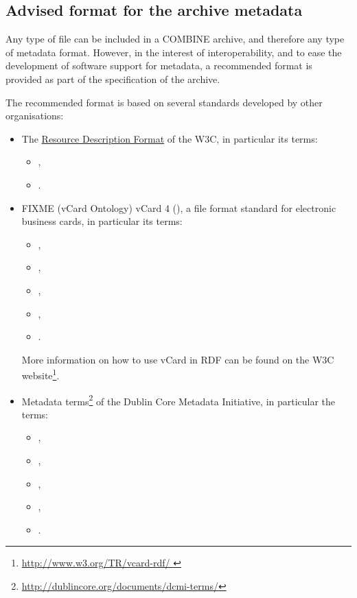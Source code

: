 \subsection{Advised format for the archive metadata}

Any type of file can be included in a COMBINE archive, and therefore any 
type of metadata format. However, in the interest of interoperability, 
and to ease the development of software support for metadata, a 
recommended format is provided as part of the specification of the 
archive. 

The recommended format is based on several standards developed by other 
organisations: 

\begin{itemize}
	\item  {
	
     The \href{http://www.w3.org/RDF/ }{ Resource Description Format} of the 
     W3C, in particular its terms:
     \begin{itemize}
		\item {}, 
		\item {}.
	\end{itemize}
	}
	\item  {

	FIXME (vCard Ontology) vCard 4 (\cite{rfc6350}), a file format standard for electronic business 
    cards, in particular its terms:
    	\begin{itemize}
		\item {}, 
		\item {}, 
		\item {}, 
		\item {},
		\item {}.
	\end{itemize}

	More information on how to use vCard in RDF can be found 
    on the W3C website\footnote[1]{\url{http://www.w3.org/TR/vcard-rdf/ }}.
	
	}
	\item {
	
	Metadata terms\footnote[2]{\url{http://dublincore.org/documents/dcmi-terms/}} of 
	the Dublin Core Metadata Initiative, in particular the terms: 

	\begin{itemize}
		\item {}, 
		\item {}, 
		\item {}, 
		\item {},
		\item {}.
	\end{itemize}
		
}
\end{itemize}
